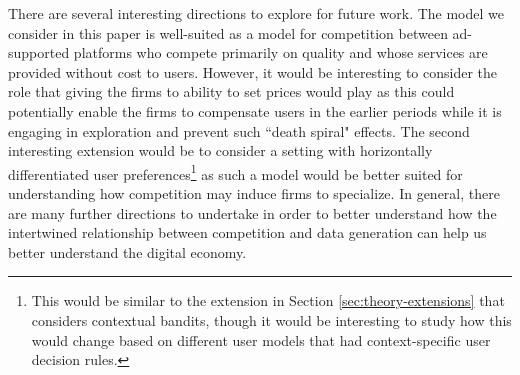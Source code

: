 \documentclass[../competing_bandits.tex]{subfiles}
\begin{document}
There are several interesting directions to explore for future work. The model we consider in this paper is well-suited as a model for competition between ad-supported platforms who compete primarily on quality and whose services are provided without cost to users. However, it would be interesting to consider the role that giving the firms to ability to set prices would play as this could potentially enable the firms to compensate users in the earlier periods while it is engaging in exploration and prevent such ``death spiral" effects. The second interesting extension would be to consider a setting with horizontally differentiated user preferences\footnote{This would be similar to the extension in Section \ref{sec:theory-extensions} that considers contextual bandits, though it would be interesting to study how this would change based on different user models that had context-specific user decision rules.} as such a model would be better suited for understanding how competition may induce firms to specialize. In general, there are many further directions to undertake in order to better understand how the intertwined relationship between competition and data generation can help us better understand the digital economy.
\end{document}
